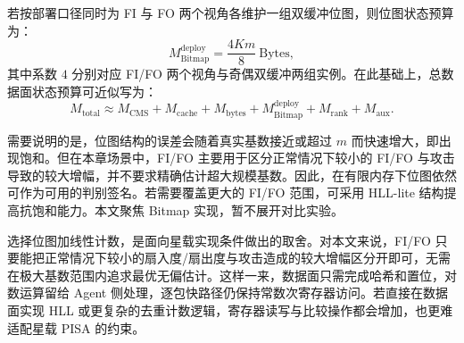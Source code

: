 若按部署口径同时为 FI 与 FO 两个视角各维护一组双缓冲位图，则位图状态预算为：
\begin{equation}
M_{\text{Bitmap}}^{\text{deploy}} = \frac{4Km}{8}\ \text{Bytes},
\label{eq:Bitmap_budget}
\end{equation}
其中系数 $4$ 分别对应 FI/FO 两个视角与奇偶双缓冲两组实例。在此基础上，总数据面状态预算可近似写为：
\begin{equation}
M_{\text{total}} \approx M_{\mathrm{CMS}} + M_{\mathrm{cache}} + M_{\text{bytes}} + M_{\text{Bitmap}}^{\text{deploy}} + M_{\text{rank}} + M_{\text{aux}}.
\label{eq:total_budget}
\end{equation}

需要说明的是，位图结构的误差会随着真实基数接近或超过 $m$ 而快速增大，即出现饱和。但在本章场景中，FI/FO 主要用于区分正常情况下较小的 FI/FO 与攻击导致的较大增幅，并不要求精确估计超大规模基数。因此，在有限内存下位图依然可作为可用的判别签名。若需要覆盖更大的 FI/FO 范围，可采用 HLL-lite 结构提高抗饱和能力。本文聚焦 Bitmap 实现，暂不展开对比实验。


选择位图加线性计数，是面向星载实现条件做出的取舍。对本文来说，FI/FO 只要能把正常情况下较小的扇入度/扇出度与攻击造成的较大增幅区分开即可，无需在极大基数范围内追求最优无偏估计。这样一来，数据面只需完成哈希和置位，对数运算留给 Agent 侧处理，逐包快路径仍保持常数次寄存器访问。若直接在数据面实现 HLL 或更复杂的去重计数逻辑，寄存器读写与比较操作都会增加，也更难适配星载 PISA 的约束。

